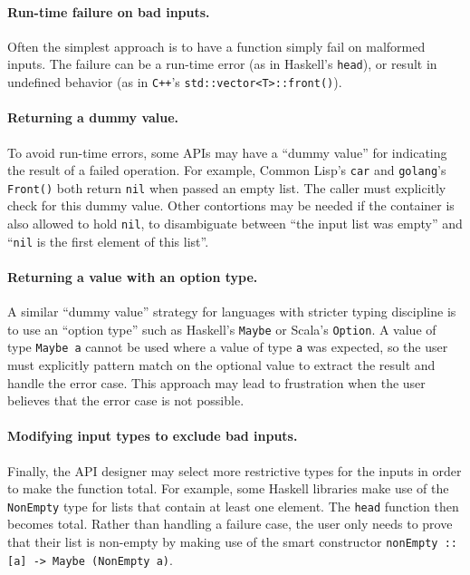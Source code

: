 \documentclass[format=sigplan, review=false, screen=true]{acmart}
\begin{document}
\paragraph{Run-time failure on bad inputs.}
Often the simplest approach is
  to have a function simply fail on malformed inputs. The failure can
  be a run-time error (as in Haskell's \texttt{head}), or result in
  undefined behavior (as in \texttt{C++}'s \texttt{std::vector<T>::front()}).
  
\paragraph{Returning a dummy value.}
  To avoid run-time errors, some APIs may have a ``dummy value''
  for indicating the result of a failed operation. For example, Common Lisp's
  \texttt{car} and \texttt{golang}'s \texttt{Front()} both return \texttt{nil}
  when passed an empty list. The caller must explicitly check for this dummy
  value. Other contortions may be needed if the container is also allowed to
  hold \texttt{nil}, to disambiguate between ``the input list was empty'' and
  ``\texttt{nil} is the first element of this list''.

\paragraph{Returning a value with an option type.}
  A similar ``dummy value'' strategy
  for languages with stricter typing discipline is to use an ``option type'' such
  as Haskell's \texttt{Maybe} or Scala's \texttt{Option}. A value of type \texttt{Maybe a}
  cannot be used where a value of type \texttt{a} was expected, so the user must
  explicitly pattern match on the optional value to extract the result and handle the
  error case. This approach may lead to frustration when the user believes that the
  error case is not possible.
  
\paragraph{Modifying input types to exclude bad inputs.}
Finally, the API designer may select more restrictive types for the inputs in order
to make the function total. For example, some Haskell libraries make use of the
\texttt{NonEmpty} type for lists that contain at least one element. The \texttt{head}
function then becomes total. Rather than handling a failure case, the user only
needs to prove that their list is non-empty by making use of the smart constructor
\texttt{nonEmpty :: [a] -> Maybe (NonEmpty a)}.
\end{document}
